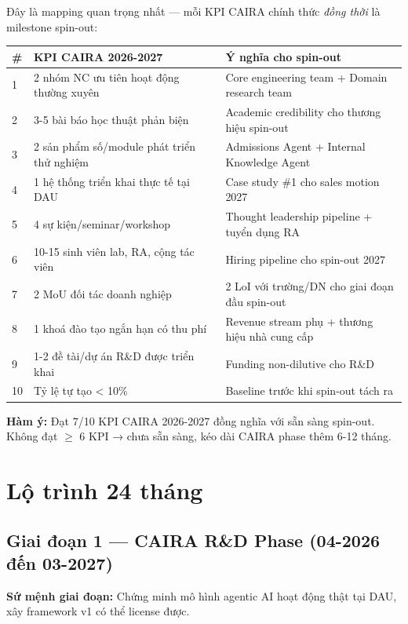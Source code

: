 \documentclass[11pt,a4paper]{article}
\begin{document}
Đây là mapping quan trọng nhất --- mỗi KPI CAIRA chính thức \textit{đồng thời} là
milestone spin-out:

\begin{tabularx}{\linewidth}{@{}p{0.5cm} p{5.5cm} X@{}}
\toprule
\textbf{\#} & \textbf{KPI CAIRA 2026-2027} & \textbf{Ý nghĩa cho spin-out} \\
\midrule
1 & 2 nhóm NC ưu tiên hoạt động thường xuyên & Core engineering team + Domain research team \\
2 & 3-5 bài báo học thuật phản biện & Academic credibility cho thương hiệu spin-out \\
3 & 2 sản phẩm số/module phát triển thử nghiệm & Admissions Agent + Internal Knowledge Agent \\
4 & 1 hệ thống triển khai thực tế tại DAU & Case study \#1 cho sales motion 2027 \\
5 & 4 sự kiện/seminar/workshop & Thought leadership pipeline + tuyển dụng RA \\
6 & 10-15 sinh viên lab, RA, cộng tác viên & Hiring pipeline cho spin-out 2027 \\
7 & 2 MoU đối tác doanh nghiệp & 2 LoI với trường/DN cho giai đoạn đầu spin-out \\
8 & 1 khoá đào tạo ngắn hạn có thu phí & Revenue stream phụ + thương hiệu nhà cung cấp \\
9 & 1-2 đề tài/dự án R\&D được triển khai & Funding non-dilutive cho R\&D \\
10 & Tỷ lệ tự tạo < 10\% & Baseline trước khi spin-out tách ra \\
\bottomrule
\end{tabularx}

\textbf{Hàm ý:} Đạt 7/10 KPI CAIRA 2026-2027 đồng nghĩa với sẵn sàng spin-out.
Không đạt $\geq$ 6 KPI → chưa sẵn sàng, kéo dài CAIRA phase thêm 6-12 tháng.

\clearpage

\section{Lộ trình 24 tháng}

\subsection{Giai đoạn 1 — CAIRA R\&D Phase (04-2026 đến 03-2027)}

\textbf{Sứ mệnh giai đoạn:} Chứng minh mô hình agentic AI hoạt động thật tại DAU, xây framework v1 có thể license được.
\end{document}
